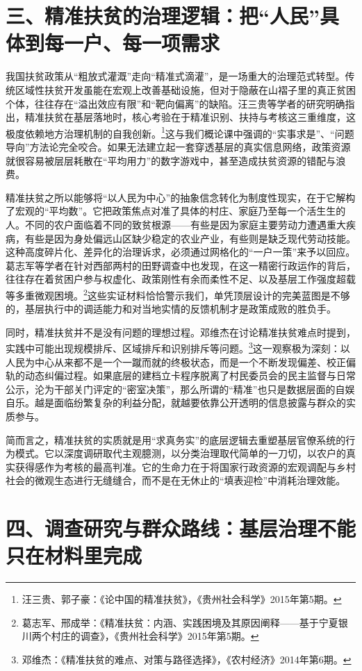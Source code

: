 \documentclass[12pt,a4paper]{ctexart}
\begin{document}
\section*{三、精准扶贫的治理逻辑：把“人民”具体到每一户、每一项需求}

我国扶贫政策从“粗放式灌溉”走向“精准式滴灌”，是一场重大的治理范式转型。传统区域性扶贫开发虽能在宏观上改善基础设施，但对于隐蔽在山褶子里的真正贫困个体，往往存在“溢出效应有限”和“靶向偏离”的缺陷。汪三贵等学者的研究明确指出，精准扶贫在基层落地时，核心考验在于精准识别、扶持与考核这三重维度，这极度依赖地方治理机制的自我创新。\footnote{汪三贵、郭子豪：《论中国的精准扶贫》，《贵州社会科学》2015年第5期。}这与我们概论课中强调的“实事求是”、“问题导向”方法论完全咬合。如果无法建立起一套穿透基层的真实信息网络，政策资源就很容易被层层耗散在“平均用力”的数字游戏中，甚至造成扶贫资源的错配与浪费。

精准扶贫之所以能够将“以人民为中心”的抽象信念转化为制度性现实，在于它解构了宏观的“平均数”。它把政策焦点对准了具体的村庄、家庭乃至每一个活生生的人。不同的农户面临着不同的致贫根源——有些是因为家庭主要劳动力遭遇重大疾病，有些是因为身处偏远山区缺少稳定的农业产业，有些则是缺乏现代劳动技能。这种高度碎片化、差异化的治理诉求，必须通过网格化的“一户一策”来予以回应。葛志军等学者在针对西部两村的田野调查中也发现，在这一精密行政运作的背后，往往存在着贫困户参与权虚化、政策刚性有余而柔性不足、以及基层工作强度超载等多重微观困境。\footnote{葛志军、邢成举：《精准扶贫：内涵、实践困境及其原因阐释——基于宁夏银川两个村庄的调查》，《贵州社会科学》2015年第5期。}这些实证材料恰恰警示我们，单凭顶层设计的完美蓝图是不够的，基层执行中的调适能力和对当地实情的反馈机制才是政策成败的胜负手。

同时，精准扶贫并不是没有问题的理想过程。邓维杰在讨论精准扶贫难点时提到，实践中可能出现规模排斥、区域排斥和识别排斥等问题。\footnote{邓维杰：《精准扶贫的难点、对策与路径选择》，《农村经济》2014年第6期。}这一观察极为深刻：以人民为中心从来都不是一个一蹴而就的终极状态，而是一个不断发现偏差、校正偏轨的动态纠偏过程。如果底层的建档立卡程序脱离了村民委员会的民主监督与日常公示，沦为干部关门评定的“密室决策”，那么所谓的“精准”也只是数据层面的自娱自乐。越是面临纷繁复杂的利益分配，就越要依靠公开透明的信息披露与群众的实质参与。

简而言之，精准扶贫的实质就是用“求真务实”的底层逻辑去重塑基层官僚系统的行为模式。它以深度调研取代主观臆测，以分类治理取代简单的一刀切，以农户的真实获得感作为考核的最高判准。它的生命力在于将国家行政资源的宏观调配与乡村社会的微观生态进行无缝缝合，而不是在无休止的“填表迎检”中消耗治理效能。

\section*{四、调查研究与群众路线：基层治理不能只在材料里完成}
\end{document}
